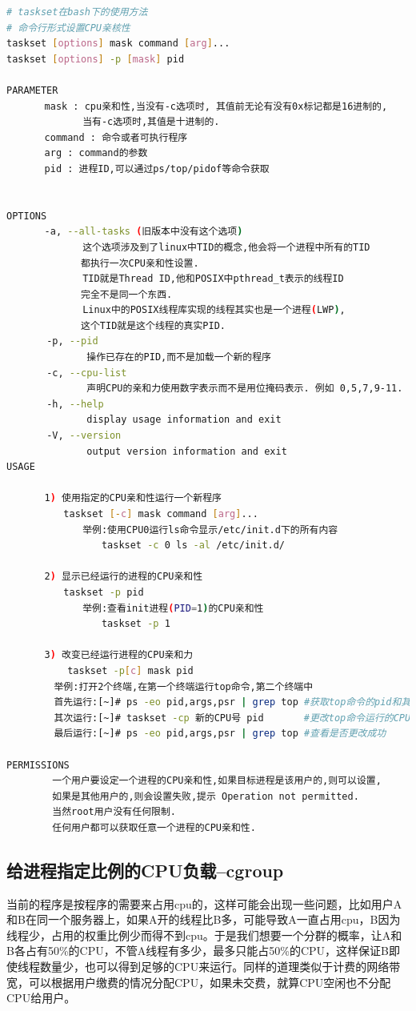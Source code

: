 \begin{lstlisting}[language={bash}]
# taskset在bash下的使用方法
# 命令行形式设置CPU亲核性
taskset [options] mask command [arg]...
taskset [options] -p [mask] pid

PARAMETER
　　　　mask : cpu亲和性,当没有-c选项时, 其值前无论有没有0x标记都是16进制的,
　　　　　　　　当有-c选项时,其值是十进制的.
　　　　command : 命令或者可执行程序
　　　　arg : command的参数
　　　　pid : 进程ID,可以通过ps/top/pidof等命令获取


OPTIONS
　　　　-a, --all-tasks (旧版本中没有这个选项)
　　　　　　　　这个选项涉及到了linux中TID的概念,他会将一个进程中所有的TID
             都执行一次CPU亲和性设置.
　　　　　　　　TID就是Thread ID,他和POSIX中pthread_t表示的线程ID
             完全不是同一个东西.
　　　　　　　　Linux中的POSIX线程库实现的线程其实也是一个进程(LWP),
             这个TID就是这个线程的真实PID.
       -p, --pid
              操作已存在的PID,而不是加载一个新的程序
       -c, --cpu-list
              声明CPU的亲和力使用数字表示而不是用位掩码表示. 例如 0,5,7,9-11.
       -h, --help
              display usage information and exit
       -V, --version
              output version information and exit
USAGE

　　　　1) 使用指定的CPU亲和性运行一个新程序
　　　　　　taskset [-c] mask command [arg]...
　　　　　　　　举例:使用CPU0运行ls命令显示/etc/init.d下的所有内容
　　　　　　　　　　taskset -c 0 ls -al /etc/init.d/

　　　　2) 显示已经运行的进程的CPU亲和性
　　　　　　taskset -p pid
　　　　　　　　举例:查看init进程(PID=1)的CPU亲和性
　　　　　　　　　　taskset -p 1

　　　　3) 改变已经运行进程的CPU亲和力
　　　　    taskset -p[c] mask pid
　　　　　举例:打开2个终端,在第一个终端运行top命令,第二个终端中
　　　　　首先运行:[~]# ps -eo pid,args,psr | grep top #获取top命令的pid和其所运行的CPU号
　　　　　其次运行:[~]# taskset -cp 新的CPU号 pid       #更改top命令运行的CPU号
　　　　　最后运行:[~]# ps -eo pid,args,psr | grep top #查看是否更改成功

PERMISSIONS
        一个用户要设定一个进程的CPU亲和性,如果目标进程是该用户的,则可以设置,
        如果是其他用户的,则会设置失败,提示 Operation not permitted.
        当然root用户没有任何限制.
        任何用户都可以获取任意一个进程的CPU亲和性.
\end{lstlisting}
\subsection{给进程指定比例的CPU负载--cgroup}
当前的程序是按程序的需要来占用cpu的，这样可能会出现一些问题，比如用户A和B在同一个服务器上，如果A开的线程比B多，可能导致A一直占用cpu，B因为线程少，占用的权重比例少而得不到cpu。于是我们想要一个分群的概率，让A和B各占有50\%的CPU，不管A线程有多少，最多只能占50\%的CPU，这样保证B即使线程数量少，也可以得到足够的CPU来运行。同样的道理类似于计费的网络带宽，可以根据用户缴费的情况分配CPU，如果未交费，就算CPU空闲也不分配CPU给用户。

